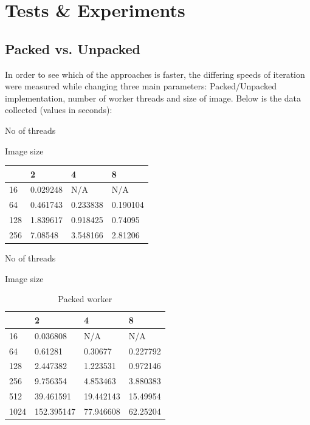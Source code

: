 \documentclass[11pt, oneside]{article}
\begin{document}
\pagebreak
\section{Tests \& Experiments}
\subsection{Packed vs. Unpacked}
In order to see which of the approaches is faster, the differing speeds of iteration were measured while changing three main parameters: Packed/Unpacked implementation, number of worker threads and size of image. Below is the data collected (values in seconds): 


\begin{center}
No of threads
\end{center}

\begin{table}[!th]
\centering
Image size
\begin{tabular}{l|lll}
    & 2        & 4        & 8        \\ \hline
16  & 0.029248 & N/A      & N/A      \\
64  & 0.461743 & 0.233838 & 0.190104 \\
128 & 1.839617 & 0.918425 & 0.74095  \\
256 & 7.08548  & 3.548166 & 2.81206 
\end{tabular}
\end{table}

\vspace{4mm}

\begin{center}
No of threads
\end{center}

\begin{table}[!th]
\centering
\label{my-label}
Image size
\begin{tabular}{l|lll}
    & 2          & 4         & 8        \\ \hline
16   & 0.036808   & N/A       & N/A      \\
64   & 0.61281    & 0.30677   & 0.227792 \\
128  & 2.447382   & 1.223531  & 0.972146 \\
256  & 9.756354   & 4.853463  & 3.880383 \\
512  & 39.461591  & 19.442143 & 15.49954 \\
1024 & 152.395147 & 77.946608 & 62.25204
\end{tabular}
\caption{Packed worker}
\end{table}
\end{document}
